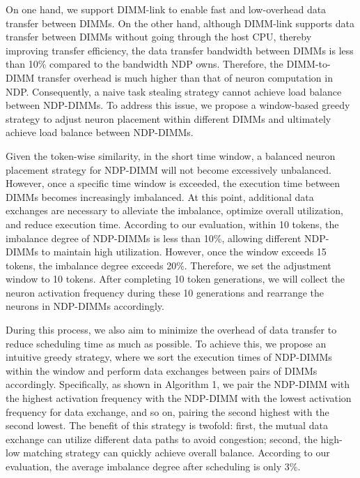 On one hand, we support DIMM-link to enable fast and low-overhead data transfer between DIMMs. On the other hand, although DIMM-link supports data transfer between DIMMs without going through the host CPU, thereby improving transfer efficiency, the data transfer bandwidth between DIMMs is less than 10\% compared to the bandwidth NDP owns. Therefore, the DIMM-to-DIMM transfer overhead is much higher than that of neuron computation in NDP. Consequently, a naive task stealing strategy cannot achieve load balance between NDP-DIMMs.
To address this issue, we propose a window-based greedy strategy to adjust neuron placement within different DIMMs and ultimately achieve load balance between NDP-DIMMs. 

Given the token-wise similarity, in the short time window, a balanced neuron placement strategy for NDP-DIMM will not become excessively unbalanced. 
However, once a specific time window is exceeded, the execution time between DIMMs becomes increasingly imbalanced. At this point, additional data exchanges are necessary to alleviate the imbalance, optimize overall utilization, and reduce execution time.
According to our evaluation, within 10 tokens, the imbalance degree of NDP-DIMMs is less than 10\%, allowing different NDP-DIMMs to maintain high utilization. However, once the window exceeds 15 tokens, the imbalance degree exceeds 20\%. Therefore, we set the adjustment window to 10 tokens. After completing 10 token generations, we will collect the neuron activation frequency during these 10 generations and rearrange the neurons in NDP-DIMMs accordingly. 

During this process, we also aim to minimize the overhead of data transfer to reduce scheduling time as much as possible.
To achieve this, we propose an intuitive greedy strategy, where we sort the execution times of NDP-DIMMs within the window and perform data exchanges between pairs of DIMMs accordingly. Specifically, as shown in Algorithm 1, we pair the NDP-DIMM with the highest activation frequency with the NDP-DIMM with the lowest activation frequency for data exchange, and so on, pairing the second highest with the second lowest. The benefit of this strategy is twofold: first, the mutual data exchange can utilize different data paths to avoid congestion; second, the high-low matching strategy can quickly achieve overall balance. According to our evaluation, the average imbalance degree after scheduling is only 3\%.